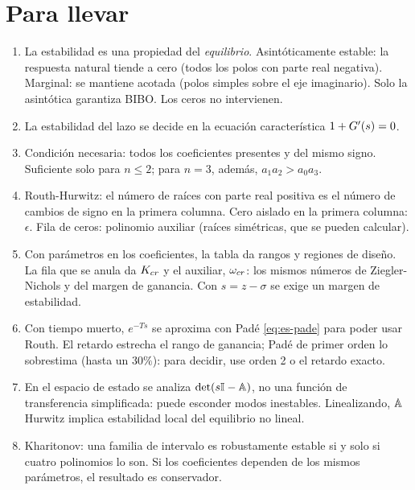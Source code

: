 \section{Para llevar}
\label{sec:es-cierre}

\begin{parallevar}
\begin{enumerate}
  \item La estabilidad es una propiedad del \emph{equilibrio}. Asintóticamente estable: la respuesta natural tiende a cero (todos los polos con parte real negativa). Marginal: se mantiene acotada (polos simples sobre el eje imaginario). Solo la asintótica garantiza BIBO. Los ceros no intervienen.
  \item La estabilidad del lazo se decide en la ecuación característica $1+G'(s)=0$.
  \item Condición necesaria: todos los coeficientes presentes y del mismo signo. Suficiente solo para $n\le2$; para $n=3$, además, $a_1a_2>a_0a_3$.
  \item Routh-Hurwitz: el número de raíces con parte real positiva es el número de cambios de signo en la primera columna. Cero aislado en la primera columna: $\epsilon$. Fila de ceros: polinomio auxiliar (raíces simétricas, que se pueden calcular).
  \item Con parámetros en los coeficientes, la tabla da rangos y regiones de diseño. La fila que se anula da $K_{cr}$ y el auxiliar, $\omega_{cr}$: los mismos números de Ziegler-Nichols y del margen de ganancia. Con $s=z-\sigma$ se exige un margen de estabilidad.
  \item Con tiempo muerto, $e^{-Ts}$ se aproxima con Padé \eqref{eq:es-pade} para poder usar Routh. El retardo estrecha el rango de ganancia; Padé de primer orden lo sobrestima (hasta un $30\%$): para decidir, use orden 2 o el retardo exacto.
  \item En el espacio de estado se analiza $\det(s\mathbb{I}-\mathbb{A})$, no una función de transferencia simplificada: puede esconder modos inestables. Linealizando, $\mathbb{A}$ Hurwitz implica estabilidad local del equilibrio no lineal.
  \item Kharitonov: una familia de intervalo es robustamente estable si y solo si cuatro polinomios lo son. Si los coeficientes dependen de los mismos parámetros, el resultado es conservador.
\end{enumerate}
\end{parallevar}

